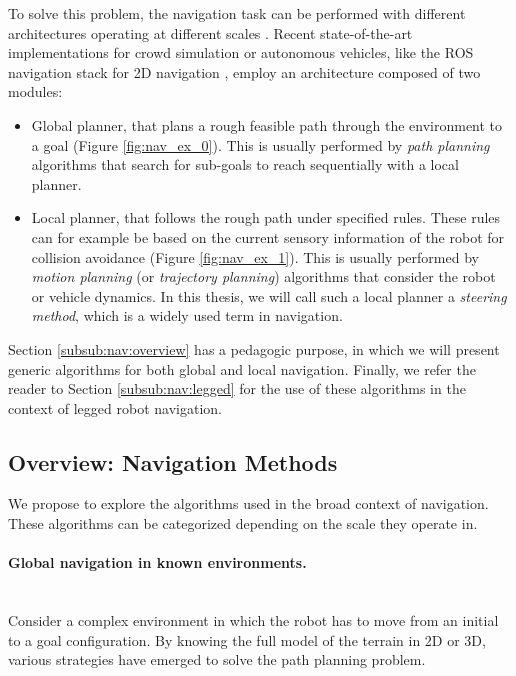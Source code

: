 To solve this problem, the navigation task can be performed with different architectures operating at different scales \cite{review_autonomous_2011}. 
Recent state-of-the-art implementations for crowd simulation \cite{vantoll_microscopic_crowd_2021} or autonomous vehicles, like the ROS navigation stack for 2D navigation \cite{ROS_software}, employ an architecture composed of two modules:
\begin{itemize}
    \item Global planner, that plans a rough feasible path through the environment to a goal (Figure \ref{fig:nav_ex_0}). This is usually performed by \textit{path planning} algorithms that search for sub-goals to reach sequentially with a local planner.
    \item Local planner, that follows the rough path under specified rules. These rules can for example be based on the current sensory information of the robot for collision avoidance (Figure \ref{fig:nav_ex_1}). 
    This is usually performed by \textit{motion planning} (or \textit{trajectory planning}) algorithms that consider the robot or vehicle dynamics. In this thesis, we will call such a local planner a \textit{steering method}, which is a widely used term in navigation.
\end{itemize}

Section \ref{subsub:nav:overview} has a pedagogic purpose, in which we will present generic algorithms for both global and local navigation.
Finally, we refer the reader to Section \ref{subsub:nav:legged} for the use of these algorithms in the context of legged robot navigation.

\subsection{Overview: Navigation Methods\label{subsub:nav:overview}}
We propose to explore the algorithms used in the broad context of navigation.
These algorithms can be categorized depending on the scale they operate in.

\paragraph{Global navigation in known environments.}\mbox{}\\

Consider a complex environment in which the robot has to move from an initial to a goal configuration.
By knowing the full model of the terrain in 2D or 3D, various strategies have emerged to solve the path planning problem.

